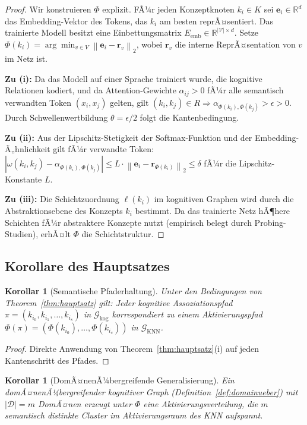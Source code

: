 ﻿\documentclass[12pt,a4paper]{article}
\theoremstyle{plain}
\newtheorem{korollar}[theorem]{Korollar}
\theoremstyle{definition}
\theoremstyle{remark}
\newcommand{\GG}{\mathcal{G}}
\newcommand{\RR}{\mathbb{R}}
\newcommand{\KNN}{\text{KNN}}
\newcommand{\norm}[1]{\left\|#1\right\|}
\begin{document}
\begin{proof}
Wir konstruieren $\Phi$ explizit. FÃ¼r jeden Konzeptknoten $k_i \in K$ sei $\mathbf{e}_i \in \RR^d$ das Embedding-Vektor des Tokens, das $k_i$ am besten reprÃ¤sentiert. Das trainierte Modell besitzt eine Einbettungsmatrix $E_{\text{emb}} \in \RR^{|\mathcal{V}| \times d}$. Setze $\Phi(k_i) = \arg\min_{v \in V} \norm{\mathbf{e}_i - \mathbf{r}_v}_2$, wobei $\mathbf{r}_v$ die interne ReprÃ¤sentation von $v$ im Netz ist.

\textbf{Zu (i):} Da das Modell auf einer Sprache trainiert wurde, die kognitive Relationen kodiert, und da Attention-Gewichte $\alpha_{ij} > 0$ fÃ¼r alle semantisch verwandten Token $(x_i, x_j)$ gelten, gilt $(k_i, k_j) \in R \Rightarrow \alpha_{\Phi(k_i),\Phi(k_j)} > \epsilon > 0$. Durch Schwellenwertbildung $\theta = \epsilon/2$ folgt die Kantenbedingung.

\textbf{Zu (ii):} Aus der Lipschitz-Stetigkeit der Softmax-Funktion und der Embedding-Ã„hnlichkeit gilt fÃ¼r verwandte Token: $|\omega(k_i,k_j) - \alpha_{\Phi(k_i),\Phi(k_j)}| \leq L \cdot \norm{\mathbf{e}_i - \mathbf{r}_{\Phi(k_i)}}_2 \leq \delta$ fÃ¼r die Lipschitz-Konstante $L$.

\textbf{Zu (iii):} Die Schichtzuordnung $\ell(k_i)$ im kognitiven Graphen wird durch die Abstraktionsebene des Konzepts $k_i$ bestimmt. Da das trainierte Netz hÃ¶here Schichten fÃ¼r abstraktere Konzepte nutzt (empirisch belegt durch Probing-Studien), erhÃ¤lt $\Phi$ die Schichtstruktur.
\end{proof}

\subsection{Korollare des Hauptsatzes}

\begin{korollar}[Semantische Pfaderhaltung]
\label{kor:pfad}
Unter den Bedingungen von Theorem~\ref{thm:hauptsatz} gilt: Jeder kognitive Assoziationspfad $\pi = (k_{i_0}, k_{i_1}, \ldots, k_{i_s})$ in $\GG_{\text{kog}}$ korrespondiert zu einem Aktivierungspfad $\Phi(\pi) = (\Phi(k_{i_0}), \ldots, \Phi(k_{i_s}))$ in $\GG_{\KNN}$.
\end{korollar}

\begin{proof}
Direkte Anwendung von Theorem~\ref{thm:hauptsatz}(i) auf jeden Kantenschritt des Pfades.
\end{proof}

\begin{korollar}[DomÃ¤nenÃ¼bergreifende Generalisierung]
\label{kor:domaine}
Ein domÃ¤nenÃ¼bergreifender kognitiver Graph (Definition~\ref{def:domainueber}) mit $|\mathcal{D}| = m$ DomÃ¤nen erzeugt unter $\Phi$ eine Aktivierungsverteilung, die $m$ semantisch distinkte Cluster im Aktivierungsraum des KNN aufspannt.
\end{korollar}
\end{document}
